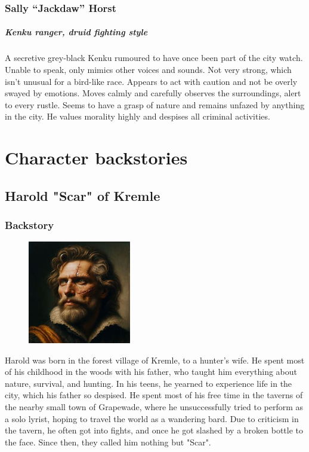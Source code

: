 \documentclass[10pt,onecolumn,twoside,openany,bg=full,layout=true]{dndbook}
\begin{document}
  \subsection{Sally “Jackdaw” Horst}\label{subsec:sally-jackdaw-horst}
  \paragraph{Kenku ranger, druid fighting style}
  A secretive grey-black Kenku rumoured to have once been part of the city watch.
  Unable to speak, only mimics other voices and sounds.
  Not very strong, which isn't unusual for a bird-like race.
  Appears to act with caution and not be overly swayed by emotions.
  Moves calmly and carefully observes the surroundings, alert to every rustle.
  Seems to have a grasp of nature and remains unfazed by anything in the city.
  He values morality highly and despises all criminal activities.

\vfill

\chapter{Character backstories}\label{ch:character-backstories}
\section{Harold "Scar" of Kremle}\label{sec:harold-"scar"-of-kremle}
\subsection{Backstory}\label{subsec:harold-backstory}
\begin{figure}
  \begin{center}
    \includegraphics[width=0.4\textwidth]{img/harold}
  \end{center}
\end{figure}
Harold was born in the forest village of Kremle, to a hunter's wife.
He spent most of his childhood in the woods with his father, who taught him everything about nature, survival, and hunting.
In his teens, he yearned to experience life in the city, which his father so despised.
He spent most of his free time in the taverns of the nearby small town of Grapewade,
where he unsuccessfully tried to perform as a solo lyrist, hoping to travel the world as a wandering bard.
Due to criticism in the tavern, he often got into fights, and once he got slashed by a broken bottle to the face.
Since then, they called him nothing but "Scar".
\end{document}
